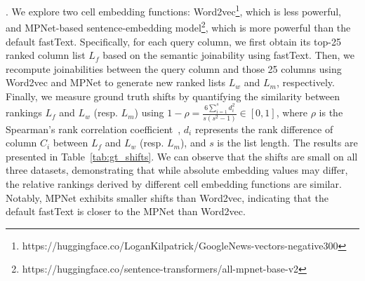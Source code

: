 . 
We explore two cell embedding functions: Word2vec\footnote{https://huggingface.co/LoganKilpatrick/GoogleNews-vectors-negative300}, which is less powerful, and MPNet-based sentence-embedding model\footnote{https://huggingface.co/sentence-transformers/all-mpnet-base-v2}, which is more powerful than the default fastText.
Specifically, for each query column, we first obtain its top-25 ranked column list $L_f$ based on the semantic joinability using fastText. Then, we recompute joinabilities between the query column and those 25 columns using Word2vec and MPNet to generate new ranked lists $L_w$ and $L_m$, respectively. 
Finally, we measure ground truth shifts by quantifying the similarity between rankings $L_f$ and $L_w$ (resp. $L_m$) using $1-\rho =  \frac{6 \sum_{i=1}^s d_i^2}{s(s^2 - 1)} \in [0,1] $, where $\rho$ is the Spearman's rank correlation coefficient~\cite{Spearman}, $d_i$ represents the rank difference of column $C_i$ between $L_f$ and $L_w$ (resp. $L_m$), and $s$ is the list length.
The results are presented in Table~\ref{tab:gt_shifts}. We can observe that the shifts are small on all three datasets, demonstrating that while absolute embedding values may differ, the relative rankings derived by different cell embedding functions are similar. Notably, MPNet exhibits smaller shifts than Word2vec, indicating that the default fastText is closer to the MPNet than Word2vec.






\begin{table} \small
\centering
\caption{ Performance of E5-base-4k. $\Delta$ indicates the difference relative to the best-performing 512-token-limit PTMs.} 
\label{tab:long_ctx}
\vspace{-2mm}
\renewcommand{\arraystretch}{1.2} %
\label{tab:ablation}
\vspace{-3mm}
\end{table}

